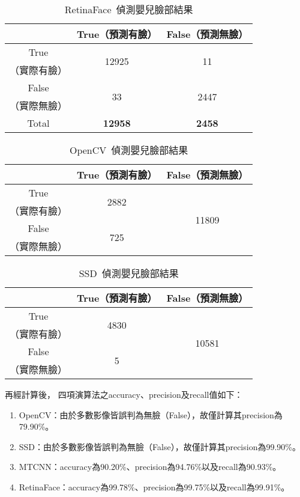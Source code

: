 \documentclass[class=NCU_thesis, crop=false]{standalone}
\begin{document}
\begin{table}[h]
    \centering
    \caption{RetinaFace~\cite{deng_retinaface_2020}偵測嬰兒臉部結果}
    \label{table:table-retinaface}
    \begin{tabular}{ccc}
    \hline
     & True（預測有臉）& False（預測無臉）\\
    \hline
    True & \multirow{2}{*}{12925} & \multirow{2}{*}{11} \\
    （實際有臉）& & \\
    False & \multirow{2}{*}{33} & \multirow{2}{*}{2447} \\
    （實際無臉）&  & \\
    \hline
    Total & \textbf{12958} & \textbf{2458} \\
    \hline
    \end{tabular}
\end{table}

\begin{table}[h]
    \centering
    \caption{OpenCV~\cite{goyal_face_2017}偵測嬰兒臉部結果}
    \label{table:table-opencv}
    \begin{tabular}{ccc}
    \hline
     & True（預測有臉）& False（預測無臉）\\
    \hline
    True & \multirow{2}{*}{2882} & \multirow{4}{*}{11809} \\
    （實際有臉）& & \\
    False & \multirow{2}{*}{725} & \\
    （實際無臉）&  & \\
    \hline
    \end{tabular}
\end{table}

\begin{table}[h]
    \centering
    \caption{SSD~\cite{ye_face_2021}偵測嬰兒臉部結果}
    \label{table:table-ssd}
    \begin{tabular}{ccc}
    \hline
     & True（預測有臉）& False（預測無臉）\\
    \hline
    True & \multirow{2}{*}{4830} & \multirow{4}{*}{10581} \\
    （實際有臉）& & \\
    False & \multirow{2}{*}{5} & \\
    （實際無臉）&  & \\
    \hline
    \end{tabular}
\end{table}

再經計算後，
四項演算法之accuracy、precision及recall值如下：
\begin{enumerate}
    \item OpenCV：由於多數影像皆誤判為無臉（False），故僅計算其precision為79.90\%。
    \item SSD：由於多數影像皆誤判為無臉（False），故僅計算其precision為99.90\%。
    \item MTCNN：accuracy為90.20\%、precision為94.76\%以及recall為90.93\%。
    \item RetinaFace：accuracy為99.78\%、precision為99.75\%以及recall為99.91\%。
\end{enumerate}
\end{document}
